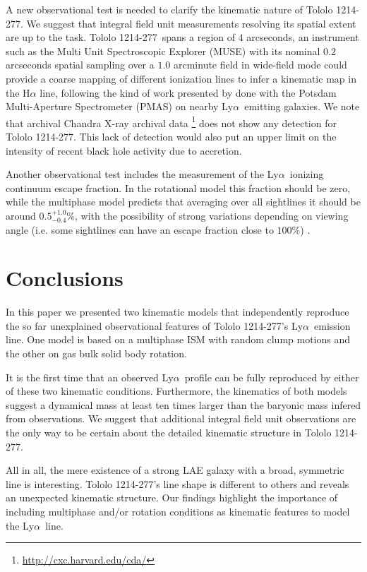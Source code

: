 \documentclass[a4,useAMS,usenatbib,usegraphicx]{mn2e}
\newcommand{\tol}{Tololo 1214-277}
\newcommand{\lya}{Ly$\alpha$}
\begin{document}
A new observational test is needed to clarify the kinematic nature of
\tol. 
We suggest that integral field unit measurements 
resolving its spatial extent are up to the task. 
\tol\ spans a region of $4$ arcseconds,
an instrument such as the Multi Unit Spectroscopic Explorer (MUSE)
\citep{2014Msngr.157...13B} with its
nominal $0.2$ arcseconds spatial sampling over a $1.0$ arcminute field
in wide-field mode could provide a coarse mapping of different
ionization lines to infer a kinematic map in the H$\alpha$ line,
following the kind of work presented by \citet{Herenz16} done with the Potsdam
Multi-Aperture Spectrometer (PMAS) \citet{PMAS} on nearby
\lya\ emitting galaxies.
We note that archival Chandra X-ray archival
data \footnote{\url{http://cxc.harvard.edu/cda/}} does not show any
detection for \tol.
This lack of detection would also put an upper limit on the intensity
of recent black hole activity due to accretion. 

Another observational test includes the measurement of the
\lya\ ionizing continuum escape fraction.
In the rotational model this fraction should be zero, while
the multiphase model predicts that averaging over all sightlines
it should be around $0.5^{+1.0}_{-0.4}$\%, with the possibility of strong
variations depending on viewing angle (i.e. some sightlines can have
an escape fraction close to $100\%$)\citep{Gronke2016} . 



\section{Conclusions}

In this paper we presented two kinematic models that independently
reproduce the so far unexplained observational features of \tol's
\lya\ emission line.  One model is based on a multiphase ISM with random clump motions and
the other on gas bulk solid body rotation.

It is the first time that an observed \lya\ profile can be fully
reproduced by either of these two kinematic conditions.
Furthermore, the kinematics of both models suggest a dynamical mass
at least ten times larger than the baryonic mass infered from observations.
We suggest that additional integral field unit observations are the
only way to be certain about the detailed kinematic structure in \tol.

All in all, the mere existence of a strong LAE galaxy with a broad,
symmetric line is interesting. 
\tol's line shape is different to others and reveals an unexpected
kinematic structure.
Our findings highlight the importance of including multiphase and/or
rotation conditions as kinematic features to model the \lya\ line.
\end{document}

